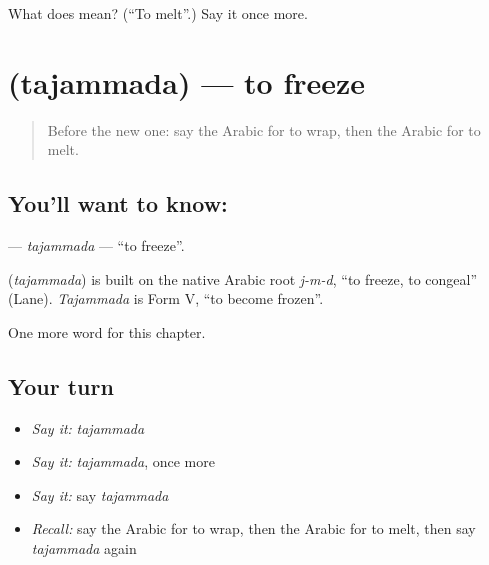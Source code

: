 \begin{tcolorbox}[breakable,colback=teal!4,colframe=teal!35!black,title={Before you move on}]
What does  mean? (\textquotedblleft{}To melt\textquotedblright{}.) Say it once more.
\end{tcolorbox}
\section[\texorpdfstring{\ar{تجمد} (tajammada)}{تجمد (tajammada)}]{ (tajammada) — to freeze}

\label{lesson:AR-C261-tajammada}



\begin{quote}
Before the new one: say the Arabic for to wrap, then the Arabic for to melt.
\end{quote}

\subsection*{You'll want to know: }
\textbf{} — \emph{tajammada} — \textquotedblleft{}to freeze\textquotedblright{}.

\begin{cousinweb}
\textbf{} (\emph{tajammada}) is built on the native Arabic root \emph{j-m-d}, \textquotedblleft{}to freeze, to congeal\textquotedblright{} (Lane). \emph{Tajammada} is Form V, \textquotedblleft{}to become frozen\textquotedblright{}.
\end{cousinweb}

\begin{grammarlens}[title={What you've built}]
One more word for this chapter.
\end{grammarlens}

\subsection*{Your turn}
\begin{itemize}
\raggedright
  \item \emph{Say it:} \emph{tajammada}
  \item \emph{Say it:} \emph{tajammada}, once more
  \item \emph{Say it:} say \emph{tajammada}
  \item \emph{Recall:} say the Arabic for to wrap, then the Arabic for to melt, then say \emph{tajammada} again
\end{itemize}

